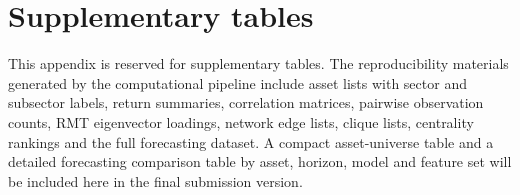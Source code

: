 \section{Supplementary tables}
\label{app:supplementary_tables}


This appendix is reserved for supplementary tables. The reproducibility materials generated by the computational pipeline include asset lists with sector and subsector labels, return summaries, correlation matrices, pairwise observation counts, RMT eigenvector loadings, network edge lists, clique lists, centrality rankings and the full forecasting dataset. A compact asset-universe table and a detailed forecasting comparison table by asset, horizon, model and feature set will be included here in the final submission version.
